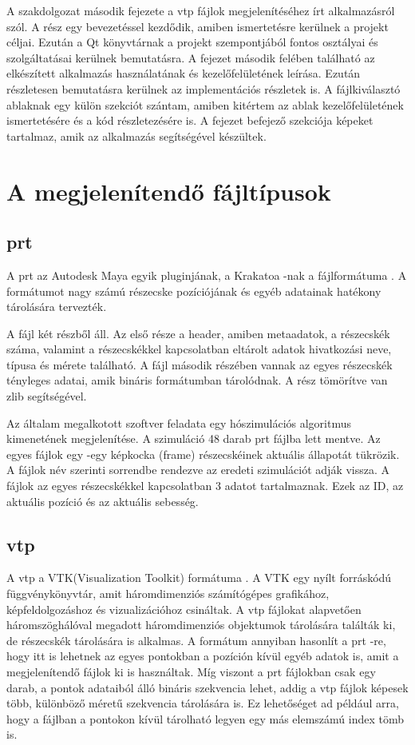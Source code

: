 A szakdolgozat második fejezete 
a vtp fájlok megjelenítéséhez írt alkalmazásról szól.
A rész egy bevezetéssel kezdődik,
amiben ismertetésre kerülnek a projekt céljai. 
Ezután a Qt könyvtárnak 
a projekt szempontjából fontos osztályai
és szolgáltatásai kerülnek bemutatásra.
A fejezet második felében található az elkészített alkalmazás
használatának és kezelőfelületének leírása.
Ezután részletesen bemutatásra kerülnek az implementációs részletek is.
A fájlkiválasztó ablaknak egy külön szekciót szántam,
amiben kitértem az ablak kezelőfelületének ismertetésére
és a kód részletezésére is.
A fejezet befejező szekciója képeket tartalmaz,
amik az alkalmazás segítségével készültek.

\section{A megjelenítendő fájltípusok}

\subsection{prt}

A prt az Autodesk Maya egyik pluginjának, 
a Krakatoa -nak a fájlformátuma \cite{prtsite}. 
A formátumot nagy számú részecske pozíciójának 
és egyéb adatainak hatékony tárolására tervezték.

A fájl két részből áll. 
Az első része a header, amiben metaadatok, a részecskék száma, 
valamint a részecskékkel kapcsolatban eltárolt adatok hivatkozási neve, 
típusa és mérete található. 
A fájl második részében vannak az egyes részecskék tényleges adatai, 
amik bináris formátumban tárolódnak. 
A rész tömörítve van zlib segítségével.

Az általam megalkotott szoftver feladata 
egy hószimulációs algoritmus kimenetének megjelenítése. 
A szimuláció 48 darab prt fájlba lett mentve. 
Az egyes fájlok egy -egy képkocka (frame) részecskéinek 
aktuális állapotát tükrözik. 
A fájlok név szerinti sorrendbe rendezve az eredeti szimulációt adják vissza. 
A fájlok az egyes részecskékkel kapcsolatban 3 adatot tartalmaznak. 
Ezek az ID, az aktuális pozíció és az aktuális sebesség.

\subsection{vtp}

A vtp a VTK(Visualization Toolkit) formátuma \cite{wiki:vtk}. 
A VTK egy nyílt forráskódú függvénykönyvtár, 
amit háromdimenziós számítógépes grafikához, képfeldolgozáshoz 
és vizualizációhoz csináltak. 
A vtp fájlokat alapvetően háromszöghálóval 
megadott háromdimenziós objektumok tárolására találták ki, 
de részecskék tárolására is alkalmas. 
A formátum annyiban hasonlít a prt -re, 
hogy itt is lehetnek az egyes pontokban a pozíción kívül egyéb adatok is, 
amit a megjelenítendő fájlok ki is használtak. 
Míg viszont a prt fájlokban csak egy darab, 
a pontok adataiból álló bináris szekvencia lehet, 
addig a vtp fájlok képesek több, 
különböző méretű szekvencia tárolására is. 
Ez lehetőséget ad például arra, 
hogy a fájlban a pontokon kívül tárolható legyen 
egy más elemszámú index tömb is. 

